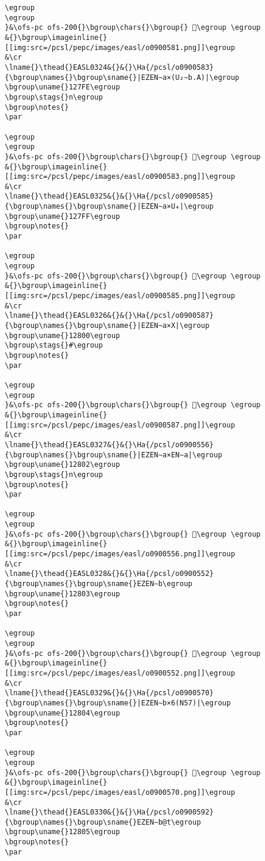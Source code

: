 \begin{verbatim}
\egroup
\egroup
}&\ofs-pc ofs-200{}\bgroup\chars{}\bgroup{} 𒟽\egroup \egroup
&{}\bgroup\imageinline{}[[img:src=/pcsl/pepc/images/easl/o0900581.png]]\egroup
&\cr
\lname{}\thead{}EASL0324&{}&{}\Ha{/pcsl/o0900583}{\bgroup\names{}\bgroup\sname{}|EZEN∼a×(U₂∼b.A)|\egroup
\bgroup\uname{}127FE\egroup
\bgroup\stags{}n\egroup
\bgroup\notes{}
\par 

\egroup
\egroup
}&\ofs-pc ofs-200{}\bgroup\chars{}\bgroup{} 𒟾\egroup \egroup
&{}\bgroup\imageinline{}[[img:src=/pcsl/pepc/images/easl/o0900583.png]]\egroup
&\cr
\lname{}\thead{}EASL0325&{}&{}\Ha{/pcsl/o0900585}{\bgroup\names{}\bgroup\sname{}|EZEN∼a×U₄|\egroup
\bgroup\uname{}127FF\egroup
\bgroup\notes{}
\par 

\egroup
\egroup
}&\ofs-pc ofs-200{}\bgroup\chars{}\bgroup{} 𒟿\egroup \egroup
&{}\bgroup\imageinline{}[[img:src=/pcsl/pepc/images/easl/o0900585.png]]\egroup
&\cr
\lname{}\thead{}EASL0326&{}&{}\Ha{/pcsl/o0900587}{\bgroup\names{}\bgroup\sname{}|EZEN∼a×X|\egroup
\bgroup\uname{}12800\egroup
\bgroup\stags{}#\egroup
\bgroup\notes{}
\par 

\egroup
\egroup
}&\ofs-pc ofs-200{}\bgroup\chars{}\bgroup{} 𒠀\egroup \egroup
&{}\bgroup\imageinline{}[[img:src=/pcsl/pepc/images/easl/o0900587.png]]\egroup
&\cr
\lname{}\thead{}EASL0327&{}&{}\Ha{/pcsl/o0900556}{\bgroup\names{}\bgroup\sname{}|EZEN∼a×EN∼a|\egroup
\bgroup\uname{}12802\egroup
\bgroup\stags{}n\egroup
\bgroup\notes{}
\par 

\egroup
\egroup
}&\ofs-pc ofs-200{}\bgroup\chars{}\bgroup{} 𒠂\egroup \egroup
&{}\bgroup\imageinline{}[[img:src=/pcsl/pepc/images/easl/o0900556.png]]\egroup
&\cr
\lname{}\thead{}EASL0328&{}&{}\Ha{/pcsl/o0900552}{\bgroup\names{}\bgroup\sname{}EZEN∼b\egroup
\bgroup\uname{}12803\egroup
\bgroup\notes{}
\par 

\egroup
\egroup
}&\ofs-pc ofs-200{}\bgroup\chars{}\bgroup{} 𒠃\egroup \egroup
&{}\bgroup\imageinline{}[[img:src=/pcsl/pepc/images/easl/o0900552.png]]\egroup
&\cr
\lname{}\thead{}EASL0329&{}&{}\Ha{/pcsl/o0900570}{\bgroup\names{}\bgroup\sname{}|EZEN∼b×6(N57)|\egroup
\bgroup\uname{}12804\egroup
\bgroup\notes{}
\par 

\egroup
\egroup
}&\ofs-pc ofs-200{}\bgroup\chars{}\bgroup{} 𒠄\egroup \egroup
&{}\bgroup\imageinline{}[[img:src=/pcsl/pepc/images/easl/o0900570.png]]\egroup
&\cr
\lname{}\thead{}EASL0330&{}&{}\Ha{/pcsl/o0900592}{\bgroup\names{}\bgroup\sname{}EZEN∼b@t\egroup
\bgroup\uname{}12805\egroup
\bgroup\notes{}
\par 


\end{verbatim}

